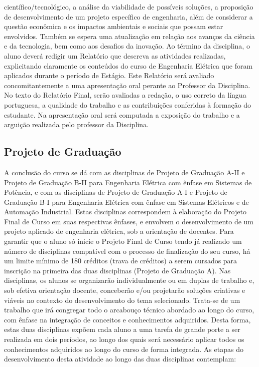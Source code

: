 científico/tecnológico, a análise da viabilidade de possíveis soluções, a proposição de desenvolvimento de um projeto específico de engenharia, além de considerar a questão econômica e os impactos ambientais e sociais que possam estar envolvidos. Também se espera uma atualização em relação aos avanços da ciência e da tecnologia, bem como aos desafios da inovação. Ao término da disciplina, o aluno deverá redigir um Relatório que descreva as atividades realizadas, explicitando claramente os conteúdos do curso de Engenharia Elétrica que foram aplicados durante o período de Estágio. Este Relatório será avaliado concomitantemente a uma apresentação oral perante ao Professor da Disciplina. No texto do Relatório Final, serão avaliadas a redação, o uso correto da língua portuguesa, a qualidade do trabalho e as contribuições conferidas à formação do estudante. Na apresentação oral será computada a exposição do trabalho e a arguição realizada pelo professor da Disciplina.

\subsection{Projeto de Graduação}

A conclusão do curso se dá com as disciplinas de Projeto de Graduação A-II e Projeto de Graduação B-II para Engenharia Elétrica com ênfase em Sistemas de Potência, e com as disciplinas de Projeto de Graduação A-I e Projeto de Graduação B-I para Engenharia Elétrica com ênfase em Sistemas Elétricos e de Automação Industrial.
Estas disciplinas correspondem à elaboração do Projeto Final de Curso em suas respectivas ênfases, e envolvem o desenvolvimento de um projeto aplicado de engenharia elétrica, sob a orientação de docentes. Para garantir que o aluno só inicie o Projeto Final de Curso tendo já realizado um número de disciplinas compatível com o processo de finalização do seu curso, há um limite mínimo de 180 créditos (trava de créditos) a serem cursados para inscrição na primeira das duas disciplinas (Projeto de Graduação A).
Nas disciplinas, os alunos se organizarão individualmente ou em duplas de trabalho e, sob efetiva orientação docente, conceberão e/ou projetarão soluções criativas e viáveis no contexto do desenvolvimento do tema selecionado.
Trata-se de um trabalho que irá congregar todo o arcabouço técnico abordado ao longo do curso, com ênfase na integração de conceitos e conhecimentos adquiridos. Desta forma, estas duas disciplinas expõem cada aluno a uma tarefa de grande porte a ser realizada em dois períodos, ao longo dos quais será necessário aplicar todos os conhecimentos adquiridos ao longo do curso de forma integrada.
As etapas do desenvolvimento desta atividade ao longo das duas disciplinas contemplam:

